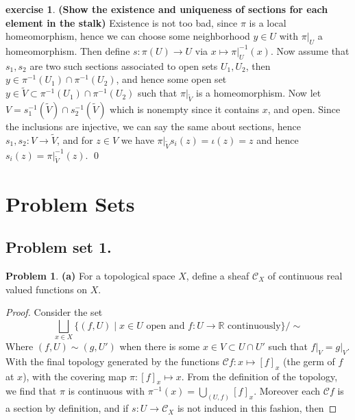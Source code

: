 \documentclass[10.5pt]{article}
\theoremstyle{definition}
\newtheorem{pb}{Problem}
\newtheorem{exe}{exercise}
\newcommand{\set}[1]{\{#1\}}
\begin{document}
    \begin{exe}\label{Existence and uniqueness sections on stalks}
        \textbf{(Show the existence and uniqueness of sections for each element in the stalk)}
        Existence is not too bad, since \(\pi\) is a local homeomorphism, hence we can choose some neighborhood \(y \in U\) with \(\pi\vert_U\) a homeomorphism. Then define \(s: \pi(U) \to U\) via \(x \mapsto \pi\vert_U^{-1}(x)\). Now assume that \(s_1,s_2\) are two such sections associated to open sets \(U_1,U_2\), then \(y \in \pi^{-1}(U_1) \cap \pi^{-1}(U_2)\), and hence some open set \(y \in \tilde{V} \subset \pi^{-1}(U_1) \cap \pi^{-1}(U_2)\) such that \(\pi\vert_{\tilde{V}}\) is a homeomorphism. Now let \(V = s_1^{-1}(\tilde{V}) \cap s_2^{-1}(\tilde{V})\) which is nonempty since it contains \(x\), and open. Since the inclusions are injective, we can say the same about sections, hence \(s_1,s_2:  V \to \tilde{V}\), and for \(z \in V\) we have \(\pi\vert_{\tilde{V}}s_i(z) = \iota(z) = z\) and hence \(s_i(z) = \pi\vert_{\tilde{V}}^{-1}(z)\). \qed
    \end{exe}
    


    \appendix

    \section{Problem Sets}
    \subsection{Problem set 1.}
    \begin{pb}
        \textbf{(a)} For a topological space \(X\), define a sheaf \(\mathcal{C}_X\) of continuous real valued functions on \(X\).
    \end{pb}
    \begin{proof}
        Consider the set 
        \[\bigsqcup_{x \in X} \set{(f,U) \mid x \in U \text{ open and }f:U\to \mathbb{R} \text{ continuously}}/\sim\]
        Where \((f,U) \sim (g,U')\) when there is some \(x \in V \subset U \cap U'\) such that \(f\vert_V = g\vert_V\).
        With the final topology generated by the functions \(\mathcal{C}f: x \mapsto [f]_x\) (the germ of \(f\) at \(x\)), with the covering map \(\pi: [f]_x \mapsto x\). From the definition of the topology, we find that \(\pi\) is continuous with \(\pi^{-1}(x) = \bigcup_{(U,f)} [f]_x\). Moreover each \(\mathcal{C}f\) is a section by definition, and if \(s: U \to \mathcal{C}_X\) is not induced in this fashion, then 
    \end{proof}
    
\end{document}
